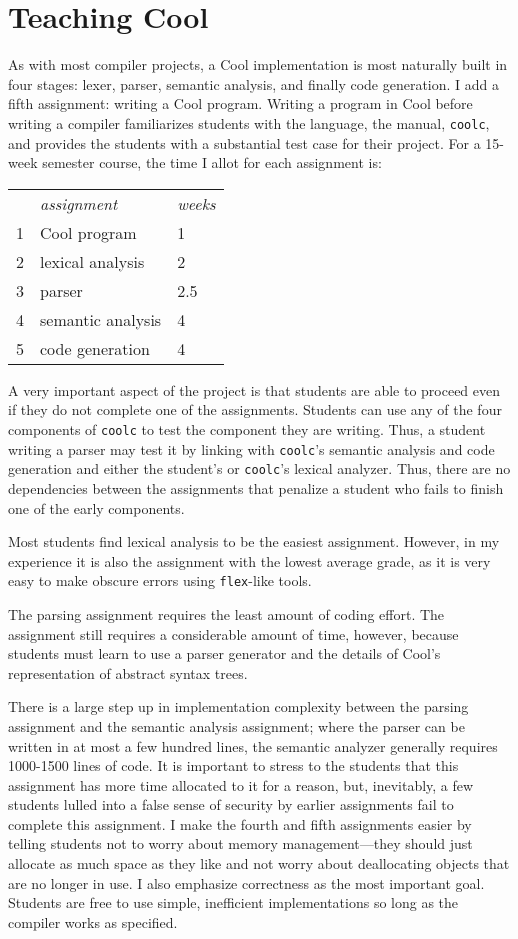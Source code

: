 \documentclass[11pt]{article}
\begin{document}
\section{Teaching Cool}

As with most compiler projects, a Cool implementation is most naturally 
built in four stages: lexer, parser, semantic analysis, and finally
code generation.  I add a fifth assignment: writing a Cool program.
Writing a program in Cool before writing a compiler familiarizes students
with the language, the manual, {\tt coolc}, and provides the students
with a substantial test case for their project.  For a 15-week semester 
course,
the time I allot for each assignment is: \\[.2in]
\begin{tabular}{lll}
 & {\em assignment} & {\em weeks} \\
1 & Cool program & 1 \\
2 & lexical analysis & 2 \\
3 & parser & 2.5 \\
4 & semantic analysis & 4 \\
5 & code generation & 4 \\[.2in]
\end{tabular}

A very important aspect of the project is that students are able to
proceed even if they do not complete one of the assignments.
Students can use any of the four components of {\tt coolc} to test the
component they are writing.  Thus, a student writing a parser may test
it by linking with {\tt coolc}'s semantic analysis and code
generation and either the student's or {\tt coolc}'s lexical
analyzer.  Thus, there are no dependencies between the assignments
that penalize a student who fails to finish one of the early components.

Most students find lexical analysis to be the easiest assignment.
However, in my experience it is also the assignment with the lowest
average grade, as it is very easy to make obscure errors using {\tt flex}-like
tools.

The parsing assignment requires the least amount of coding effort.
The assignment still requires a considerable amount of time, however,
because students must learn to use a parser generator and the details
of Cool's representation of abstract syntax trees.

There is a large step up in implementation complexity between the
parsing assignment and the semantic analysis assignment; where the
parser can be written in at most a few hundred lines, the semantic
analyzer generally requires 1000-1500 lines of code.  It is important
to stress to the students that this assignment has more time allocated
to it for a reason, but, inevitably, a few students lulled into a false
sense of security by earlier assignments fail to complete this
assignment. 
 I make the fourth and fifth assignments easier by telling students
not to worry about memory management---they should just allocate as
much space as they like and not worry about deallocating objects that
are no longer in use.  I also emphasize correctness as the most important
goal.  Students are free to use simple, inefficient implementations
so long as the compiler works as specified.
\end{document}
